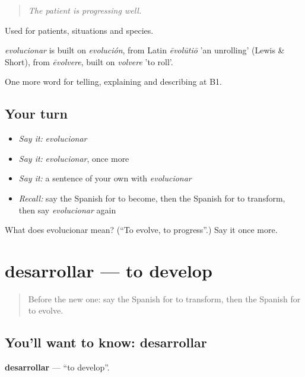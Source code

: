 \begin{quote}
\emph{The patient is progressing well.}
\end{quote}

Used for patients, situations and species.

\begin{cousinweb}
\emph{evolucionar} is built on \emph{evolución}, from Latin \emph{ēvolūtiō} 'an unrolling' (Lewis \& Short), from \emph{ēvolvere}, built on \emph{volvere} 'to roll'.
\end{cousinweb}

\begin{grammarlens}[title={What you've built}]
One more word for telling, explaining and describing at B1.
\end{grammarlens}

\subsection*{Your turn}
\begin{itemize}
\raggedright
  \item \emph{Say it:} \emph{evolucionar}
  \item \emph{Say it:} \emph{evolucionar}, once more
  \item \emph{Say it:} a sentence of your own with \emph{evolucionar}
  \item \emph{Recall:} say the Spanish for to become, then the Spanish for to transform, then say \emph{evolucionar} again
\end{itemize}

\begin{tcolorbox}[breakable,colback=teal!4,colframe=teal!35!black,title={Before you move on}]
What does evolucionar mean? (\textquotedblleft{}To evolve, to progress\textquotedblright{}.) Say it once more.
\end{tcolorbox}
\section[desarrollar]{desarrollar — to develop}

\label{lesson:ES-C572-desarrollar}



\begin{quote}
Before the new one: say the Spanish for to transform, then the Spanish for to evolve.
\end{quote}

\subsection*{You'll want to know: desarrollar}
\textbf{desarrollar} — \textquotedblleft{}to develop\textquotedblright{}.

